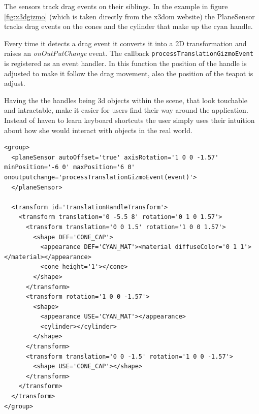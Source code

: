 The sensors track drag events on their siblings. In the example in figure \ref{fig:x3dgizmo}
(which is taken directly from the x3dom website) the PlaneSensor tracks
drag events on the cones and the cylinder that make up the cyan handle.

Every time it detects a drag event it converts it into a 2D
transformation and raises an \emph{onOutPutChange} event. The callback
\texttt{processTranslationGizmoEvent} is registered as an event handler.
In this function the position of the handle is adjusted to make it
follow the drag movement, also the position of the teapot is adjust.

Having the the handles being 3d objects within the scene, that look
touchable and intractable, make it easier for users find their way
around the application. Instead of haven to learn keyboard shortcuts the
user simply uses their intuition about how she would interact with
objects in the real world.

\begin{verbatim}
<group>
  <planeSensor autoOffset='true' axisRotation='1 0 0 -1.57' minPosition='-6 0' maxPosition='6 0' onoutputchange='processTranslationGizmoEvent(event)'>
  </planeSensor>

  <transform id='translationHandleTransform'>
    <transform translation='0 -5.5 8' rotation='0 1 0 1.57'>
      <transform translation='0 0 1.5' rotation='1 0 0 1.57'>
        <shape DEF='CONE_CAP'>
          <appearance DEF='CYAN_MAT'><material diffuseColor='0 1 1'></material></appearance>
          <cone height='1'></cone>
        </shape>
      </transform>
      <transform rotation='1 0 0 -1.57'>
        <shape>
          <appearance USE='CYAN_MAT'></appearance>
          <cylinder></cylinder>
        </shape>
      </transform>
      <transform translation='0 0 -1.5' rotation='1 0 0 -1.57'>
        <shape USE='CONE_CAP'></shape>
      </transform>
    </transform>
  </transform>
</group>
\end{verbatim}

